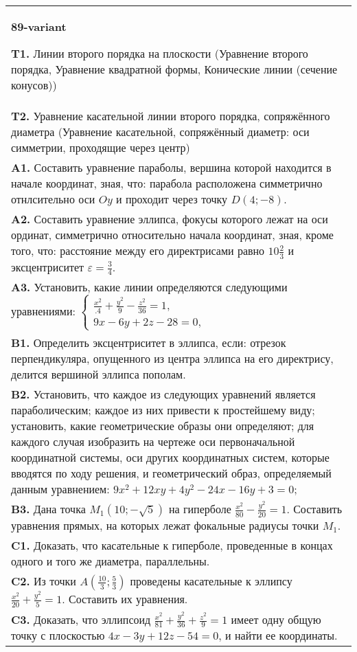 \documentclass{article}
\begin{document}
\begin{tabular}{m{17cm}}
\textbf{89-variant}
\newline

\textbf{T1.} Линии второго порядка на плоскости (Уравнение второго порядка, Уравнение квадратной формы, Конические линии (сечение конусов)) \\
\textbf{T2.} Уравнение касательной линии второго порядка, сопряжённого диаметра (Уравнение касательной, сопряжённый диаметр: оси симметрии, проходящие через центр) \\
\textbf{A1.} Составить уравнение параболы, вершина которой находится в начале координат, зная, что: парабола расположена симметрично отнлсительно оси $O y$ и проходит через точку $D(4 ;-8)$. \\
\textbf{A2.} Составить уравнение эллипса, фокусы которого лежат на оси ординат, симметрично относительно начала координат, зная, кроме того, что: расстояние между его директрисами равно $10 \frac{2}{3}$ и эксцентриситет $\varepsilon=\frac{3}{4}$. \\
\textbf{A3.} Установить, какие линии определяются следующими уравнениями: $\left\{\begin{array}{l}\frac{x^2}{.4}+\frac{y^2}{9}-\frac{z^2}{36}=1, \\ 9 x-6 y+2 z-28=0,\end{array}\right.$ \\
\textbf{B1.} Определить эксцентриситет в эллипса, если: отрезок перпендикуляра, опущенного из центра эллипса на его директрису, делится вершиной эллипса пополам. \\
\textbf{B2.} Установить, что каждое из следующих уравнений является параболическим; каждое из них привести к простейшему виду; установить, какие геометрические образы они определяют; для каждого случая изобразить на чертеже оси первоначальной координатной системы, оси других координатных систем, которые вводятся по ходу решения, и геометрический образ, определяемый данным уравнением: $9 x^2+12 x y+4 y^2-24 x-16 y+3=0$; \\
\textbf{B3.} Дана точка $M_1(10 ;-\sqrt{5})$ на гиперболе $\frac{x^2}{80}-\frac{y^2}{20}=1$. Составить уравнения прямых, на которых лежат фокальные радиусы точки $M_1$. \\
\textbf{C1.} Доказать, что касательные к гиперболе, проведенные в концах одного и того же диаметра, параллельны. \\
\textbf{C2.} Из точки $A\left(\frac{10}{3} ; \frac{5}{3}\right)$ проведены касательные к эллипсу $\frac{x^2}{20}+\frac{y^2}{5}=1$. Составить их уравнения. \\
\textbf{C3.} Доказать, что эллипсоид $\frac{x^2}{81}+\frac{y^2}{36}+\frac{z^2}{9}=1$ имеет одну общую точку с плоскостью $4 x-3 y+12 z-54=0$, и найти ее координаты. \\

\end{tabular}
\vspace{1cm}
\end{document}
